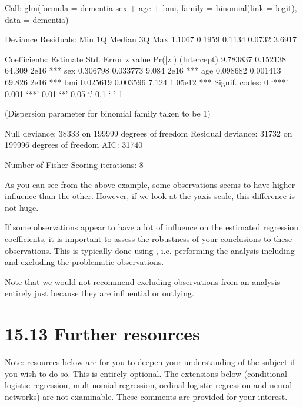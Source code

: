 \documentclass[letterpaper,10pt,english]{jupyterBook}
\begin{document}
\begin{sphinxVerbatim}[commandchars=\\\{\}]
Call:
glm(formula = dementia \PYGZti{} sex + age + bmi, family = binomial(link = \PYGZdq{}logit\PYGZdq{}), 
    data = dementia)

Deviance Residuals: 
    Min       1Q   Median       3Q      Max  
\PYGZhy{}1.1067  \PYGZhy{}0.1959  \PYGZhy{}0.1134  \PYGZhy{}0.0732   3.6917  

Coefficients:
             Estimate Std. Error z value Pr(\PYGZgt{}|z|)    
(Intercept) \PYGZhy{}9.783837   0.152138 \PYGZhy{}64.309  \PYGZlt{} 2e\PYGZhy{}16 ***
sex          0.306798   0.033773   9.084  \PYGZlt{} 2e\PYGZhy{}16 ***
age          0.098682   0.001413  69.826  \PYGZlt{} 2e\PYGZhy{}16 ***
bmi         \PYGZhy{}0.025619   0.003596  \PYGZhy{}7.124 1.05e\PYGZhy{}12 ***
\PYGZhy{}\PYGZhy{}\PYGZhy{}
Signif. codes:  0 ‘***’ 0.001 ‘**’ 0.01 ‘*’ 0.05 ‘.’ 0.1 ‘ ’ 1

(Dispersion parameter for binomial family taken to be 1)

    Null deviance: 38333  on 199999  degrees of freedom
Residual deviance: 31732  on 199996  degrees of freedom
AIC: 31740

Number of Fisher Scoring iterations: 8
\end{sphinxVerbatim}

\noindent{}

\sphinxAtStartPar
As you can see from the above example, some observations seems to have higher influence than the other. However, if we look at the y\sphinxhyphen{}axis scale, this difference is not huge.

\sphinxAtStartPar
If some observations appear to have a lot of influence on the estimated regression coefficients, it is important to assess the robustness of your conclusions to these observations. This is typically done using , i.e. performing the analysis including and excluding the problematic observations.

\sphinxAtStartPar
Note that we would not recommend excluding observations from an analysis entirely just because they are influential or outlying.


\section{15.13 Further resources}
\label{\detokenize{15.l. Logistic Regression:further-resources}}\label{\detokenize{15.l. Logistic Regression::doc}}
\sphinxAtStartPar
Note:  resources below are for you to deepen your understanding of the subject if you wish to do so. This is entirely optional. The extensions below (conditional logistic regression, multinomial regression, ordinal logistic regression and neural networks) are not examinable. These comments are provided for your interest.
\end{document}
